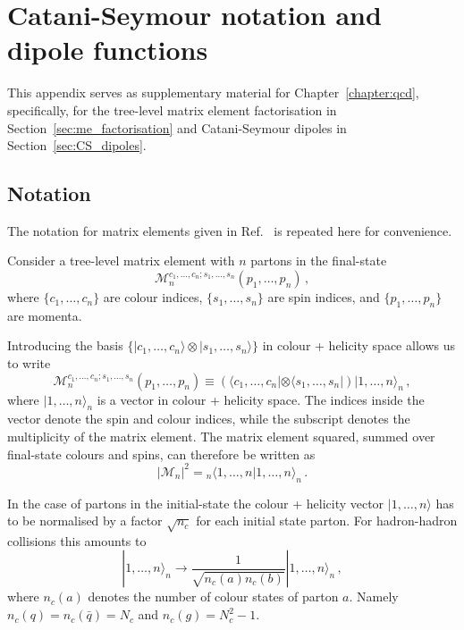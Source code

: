 \documentclass[main.tex]{subfiles}
\begin{document}
\chapter{Catani-Seymour notation and dipole functions}
\label{appendix:catani_seymour}
    This appendix serves as supplementary material for Chapter~\ref{chapter:qcd},
    specifically, for the tree-level matrix element factorisation in Section~\ref{sec:me_factorisation}
    and Catani-Seymour dipoles in Section~\ref{sec:CS_dipoles}.
    \section{Notation}
    The notation for matrix elements given in Ref.~\cite{Catani:1996vz}
    is repeated here for convenience.

    Consider a tree-level matrix element with $n$ partons in
    the final-state
    \begin{equation}\label{eqn:CS_ME}
        \mathcal{M}^{c_{1},\ldots,c_{n};s_{1},\ldots,s_{n}}_{n}(p_{1},\ldots,p_{n}) \, ,
    \end{equation}
    where $\{c_{1},\ldots,c_{n}\}$ are colour indices,
    $\{s_{1},\ldots,s_{n}\}$ are spin indices,
    and $\{p_{1},\ldots,p_{n}\}$ are momenta.

    Introducing the basis $\{| c_{1},\ldots,c_{n} \rangle \otimes | s_{1},\ldots,s_{n} \rangle \}$
    in colour + helicity space allows us to write
    \begin{equation}\label{eqn:CS_hilbert}
        \mathcal{M}^{c_{1},\ldots,c_{n};s_{1},\ldots,s_{n}}_{n}(p_{1},\ldots,p_{n}) \equiv \left(\langle c_{1},\ldots,c_{n} | \otimes \langle s_{1},\ldots,s_{n} | \right) | 1, \ldots,n \rangle_{n} \, ,
    \end{equation}
    where $|1, \ldots, n \rangle_{n}$ is a vector in colour + helicity space.
    The indices inside the vector denote the spin and colour indices,
    while the subscript denotes the multiplicity of the matrix element.
    The matrix element squared, summed over final-state colours and spins,
    can therefore be written as
    \begin{equation}\label{eqn:CS_ME2}
        |\mathcal{M}_{n}|^{2} = {}_{n} \langle 1,\ldots,n|1,\ldots,n\rangle_{n} \, .
    \end{equation}

    In the case of partons in the initial-state the colour + helicity vector
    $|1, \ldots, n \rangle$ has to be normalised by a factor $\sqrt{n_{c}}$ for each
    initial state parton. For hadron-hadron collisions this amounts to
    \begin{equation}
        | 1, \ldots, n \rangle_{n} \rightarrow \dfrac{1}{\sqrt{n_{c}(a)n_{c}(b)}} | 1, \ldots, n \rangle_{n} \, ,
    \end{equation}
    where $n_{c}(a)$ denotes the number of colour states of parton $a$.
    Namely $n_{c}(q) = n_{c}(\bar{q}) = N_{c}$ and $n_{c}(g) = N_{c}^{2}-1$.
\end{document}
